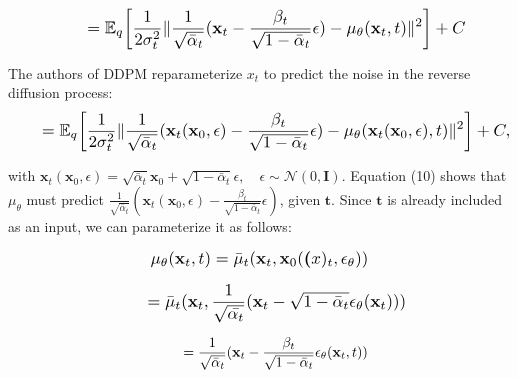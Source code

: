 \documentclass{article}
\newcommand*{\Scale}[2][4]{\scalebox{#1}{\ensuremath{#2}}}
\begin{document}
\begin{equation}
\Scale[1.2]{ \displaystyle
\hspace{2em} = \mathbb{E}_{q} \left[ 
\frac{1}{2\sigma_t^2}
\norm{
\frac{1}{\sqrt{\bar{\alpha}_t}}(\textbf{x}_t - \frac{\beta_t}{\sqrt{1-\bar{\alpha}_t}} \epsilon)
-
\mu_\theta(\textbf{x}_{t},t)
}^2
\right] + C 
}
\end{equation}

The authors of DDPM reparameterize $ x_t $ to predict the noise in the reverse diffusion process:
\begin{equation}
\Scale[1.2]{ \displaystyle
\hspace{2em} = \mathbb{E}_{q} \left[ 
\frac{1}{2\sigma_t^2}
\norm{
\frac{1}{\sqrt{\bar{\alpha}_t}} ( \textbf{x}_t(\textbf{x}_0,\epsilon ) - \frac{\beta_t}{\sqrt{1-\bar{\alpha}_t}} \epsilon)
-
\mu_\theta(\textbf{x}_t(\textbf{x}_0,\epsilon),t)
}^2
\right] + C, }
\end{equation}

with $ \textbf{x}_t(\textbf{x}_0,\epsilon) = \sqrt{\bar{\alpha}_t}\textbf{x}_0 + \sqrt{1-\bar{\alpha}_t}\epsilon, \hspace{1em} \epsilon \sim\mathscr{N}(0,\textbf{I}). $
Equation (10) shows that $ \mu_\theta $ must predict $ \frac{1}{\sqrt{\bar{\alpha}_t}} ( \textbf{x}_t(\textbf{x}_0,\epsilon ) - \frac{\beta_t}{\sqrt{1-\bar{\alpha}_t}} \epsilon) $, given $ \textbf{t} $. Since $ \textbf{t} $ is already included as an input, we can parameterize it as follows:

\begin{equation}
\Scale[1.2]{ \displaystyle
\mu_\theta(\textbf{x}_{t},t) = \bar{\mu}_t(\textbf{x}_{t}, \textbf{x}_0(\textbf(x)_t, \epsilon_\theta)) }
\end{equation}

\begin{equation}
\Scale[1.2]{ \displaystyle
\hspace{2em} = \bar{\mu}_t(\textbf{x}_{t}, \frac{1}{\sqrt{\bar{\alpha_t}}}(\textbf{x}_{t} - \sqrt{1-\bar{\alpha}_t} \epsilon_\theta(\textbf{x}_t))) }
\end{equation}

\begin{fleqn}[\parindent]
\begin{equation}
\begin{split}
\hspace{2.25em} = \frac{1}{\sqrt{\bar{\alpha}_t}} ( \textbf{x}_t - \frac{\beta_t}{\sqrt{1-\bar{\alpha}_t}} \epsilon_\theta(\textbf{x}_t, t))
\end{split}
\end{equation}
\end{fleqn}
\end{document}
